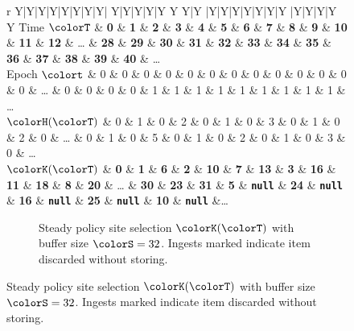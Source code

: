 \begin{figure}[htbp!]
  \centering

\begin{minipage}{\textwidth}
  \scriptsize
  \setlength{\tabcolsep}{2.5pt}
  \begin{tabularx}{\textwidth}{
    r
    Y|Y|Y|Y|Y|Y|Y|Y|
    Y|Y|Y|Y|Y Y Y|Y
    |Y|Y|Y|Y|Y|Y|Y
    |Y|Y|Y|Y Y
    }
     { Time $\colorT$} & \textbf{0} & \textbf{1} & \textbf{2} & \textbf{3} & \textbf{4} & \textbf{5} & \textbf{6} & \textbf{7}
    & \textbf{8} & \textbf{9} & \textbf{10} & \textbf{11} & \textbf{12} %
    &  \ldots
    & \textbf{28} & \textbf{29} & \textbf{30} & \textbf{31}
    & \textbf{32} & \textbf{33} & \textbf{34} & \textbf{35}
    & \textbf{36} & \textbf{37} & \textbf{38} & \textbf{39} & \textbf{40}
    & \ldots \\ \hline
   { Epoch $\colort$} & 0 & 0 & 0 & 0 & 0 & 0 & 0 & 0
    & 0 & 0 & 0 & 0 & 0 %
    &  \ldots
    & 0 & 0 & 0 & 0
    & 1 & 1 & 1 & 1
    & 1 & 1 & 1 & 1 & 1
    & \ldots \\
    { \scriptsize$\colorH(\colorT)$} & 0 & 1 & 0 & 2 & 0 & 1 & 0 & 3
    & 0 & 1 & 0 & 2 & 0 %
    &  \ldots
    & 0 & 1 & 0 & 5
    & 0 & 1 & 0 & 2
    & 0 & 1 & 0 & 3 & 0
    & \ldots \\
    \hline
     { \scriptsize $\colorK(\colorT)$} & \textbf{0} & \textbf{1} & \textbf{6} & \textbf{2} & \textbf{10} & \textbf{7} & \textbf{13} & \textbf{3}
     & \textbf{16} & \textbf{11} & \textbf{18} & \textbf{8} & \textbf{20} & \ldots
 & \textbf{30} & \textbf{23} & \textbf{31} & \textbf{5} & {\tiny \texttt{\textbf{null\hphantom{}}}}  %
 & \textbf{24} & {\tiny \texttt{\textbf{null\hphantom{}}}} & \textbf{16}
 & {\tiny \texttt{\textbf{null\hphantom{}}}} & \textbf{25} & {\tiny \texttt{\textbf{null\hphantom{}}}} & \textbf{10} & {\tiny \texttt{\textbf{null\hphantom{}}}}  &\ldots
  \end{tabularx}
\end{minipage}
\vspace{-0.5ex}
\begin{subfigure}{\textwidth}
\caption{\footnotesize Steady policy site selection $\colorK(\colorT)$ with buffer size $\colorS=32$. Ingests marked \nullval{} indicate item discarded without storing.}
\label{fig:hsurf-steady-implementation-site-selection}
\end{subfigure}
\vspace{-0.5ex}


\end{figure}
